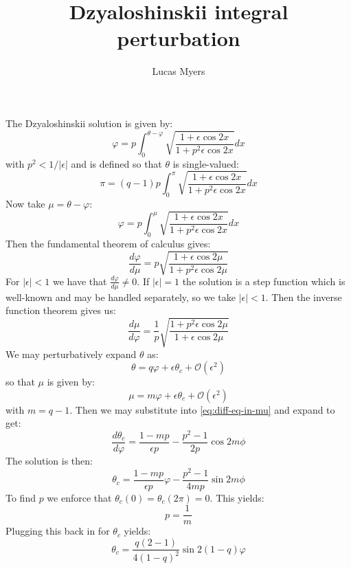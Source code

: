 \documentclass[reqno]{article}
\begin{document}
\title{Dzyaloshinskii integral perturbation}
\author{Lucas Myers}
\maketitle

The Dzyaloshinskii solution is given by:
\begin{equation}
    \varphi
    =
    p \int_0^{\theta - \varphi}
    \sqrt{\frac{1 + \epsilon \cos 2x}{1 + p^2 \epsilon \cos 2x}} dx
\end{equation}
with $p^2 < 1 / |\epsilon|$ and is defined so that $\theta$ is single-valued:
\begin{equation}
    \pi
    =
    (q - 1) p \int_0^\pi \sqrt{\frac{1 + \epsilon \cos 2x}{1 + p^2 \epsilon \cos 2x}} dx
\end{equation}
Now take $\mu = \theta - \varphi$:
\begin{equation}
    \varphi
    =
    p \int_0^{\mu}
    \sqrt{\frac{1 + \epsilon \cos 2x}{1 + p^2 \epsilon \cos 2x}} dx
\end{equation}
Then the fundamental theorem of calculus gives:
\begin{equation}
    \frac{d \varphi}{d \mu}
    =
    p \sqrt{\frac{1 + \epsilon \cos 2\mu}{1 + p^2 \epsilon \cos 2\mu}}
\end{equation}
For $|\epsilon| < 1$ we have that $\frac{d \varphi}{d \mu} \neq 0$.
If $|\epsilon| = 1$ the solution is a step function which is well-known and may be handled separately, so we take $|\epsilon| < 1$.
Then the inverse function theorem gives us:
\begin{equation} \label{eq:diff-eq-in-mu}
    \frac{d\mu}{d\varphi}
    =
    \frac{1}{p} \sqrt{\frac{1 + p^2 \epsilon \cos 2\mu}{1 + \epsilon \cos 2\mu}}
\end{equation}
We may perturbatively expand $\theta$ as:
\begin{equation}
    \theta
    =
    q \varphi
    + \epsilon \theta_c
    + \mathcal{O}(\epsilon^2)
\end{equation}
so that $\mu$ is given by:
\begin{equation}
    \mu
    =
    m \varphi
    + \epsilon \theta_c
    + \mathcal{O}(\epsilon^2)
\end{equation}
with $m = q - 1$.
Then we may substitute into \eqref{eq:diff-eq-in-mu} and expand to get:
\begin{equation}
    \frac{d\theta_c}{d\varphi}
    =
    \frac{1 - mp}{\epsilon p}
    - \frac{p^2 - 1}{2 p} \cos 2 m \phi
\end{equation}
The solution is then:
\begin{equation}
    \theta_c
    =
    \frac{1 - mp}{\epsilon p} \varphi
    - \frac{p^2 - 1}{4m p} \sin 2 m \phi
\end{equation}
To find $p$ we enforce that $\theta_c(0) = \theta_c(2 \pi) = 0$.
This yields:
\begin{equation}
    p 
    = 
    \frac{1}{m}
\end{equation}
Plugging this back in for $\theta_c$ yields:
\begin{equation}
    \theta_c
    =
    \frac{q(2 - 1)}{4 (1 - q)^2} \sin 2 (1 - q) \varphi
\end{equation}
\end{document}
